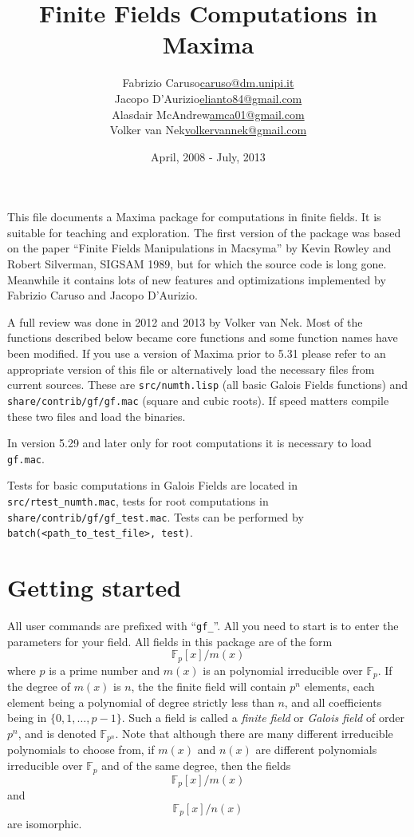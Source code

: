 \documentclass[a4paper,11pt,leqno,fleqn]{artikel3}
\title{Finite Fields Computations in Maxima}
\author{
\begin{tabular}{lr}  Fabrizio Caruso &  \url{caruso@dm.unipi.it} \\
 Jacopo D'Aurizio &  \url{elianto84@gmail.com} \\
 Alasdair McAndrew & \url{amca01@gmail.com}  \\
 Volker van Nek & \url{volkervannek@gmail.com} 
\end{tabular}
}
\date{April, 2008 - July, 2013}
\begin{document}
\maketitle


This file documents a Maxima package for computations in finite fields.  
It is suitable for teaching and exploration.
The first version of the package was based on the paper
``Finite Fields Manipulations in Macsyma'' by Kevin Rowley and Robert
Silverman, SIGSAM 1989, but for which the source code is long gone.
Meanwhile it contains lots of new features
and optimizations implemented by Fabrizio Caruso and Jacopo D'Aurizio.


A full review was done in 2012 and 2013 by Volker van Nek. Most of the functions described below 
became core functions and some function names have been modified. 
If you use a version of Maxima prior to 5.31 please refer to an appropriate 
version of this file or alternatively load the necessary files from current sources. 
These are \texttt{src/numth.lisp} (all basic Galois Fields functions) 
and \texttt{share/contrib/gf/gf.mac} (square and cubic roots). 
If speed matters compile these two files and load the binaries.


In version 5.29 and later only for root computations it is necessary to 
load \texttt{gf.mac}. 


Tests for basic computations in Galois Fields are located in 
\texttt{src/rtest\_numth.mac}, tests for root computations in 
\texttt{share/contrib/gf/gf\_test.mac}. Tests can be performed by \\
\texttt{batch(<path\_to\_test\_file>, test)}.


\section*{Getting started}
All user commands are prefixed with ``\verb!gf_!''. All you need to start is
to enter the parameters for your field.  All fields in this package are of the
form
\[
\mathbb{F}_p[x]/{m(x)}
\]
where $p$ is a prime number and $m(x)$ is an polynomial irreducible over
$\mathbb{F}_p$.  If the degree of $m(x)$ is $n$, the the finite
field will contain $p^n$ elements, each element being a polynomial of degree
strictly less than $n$, and all coefficients being in $\{0,1,\ldots,p-1\}$.
Such a field is called a \emph{finite field} or \emph{Galois field} of order
$p^n$, and is denoted $\mathbb{F}_{p^n}$.  Note that although there are many different
irreducible polynomials to choose from, if $m(x)$ and $n(x)$ are different
polynomials irreducible over $\mathbb{F}_p$  and of the same degree,
then the fields 
\[
\mathbb{F}_p[x]/{m(x)}
\]
and
\[
\mathbb{F}_p[x]/{n(x)}
\]
are isomorphic.
\end{document}
